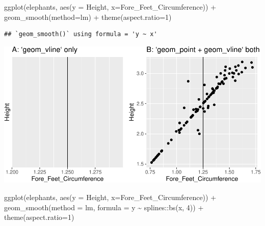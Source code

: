 \documentclass[
]{book}
\newenvironment{Shaded}{\begin{snugshade}}{\end{snugshade}}
\newcommand{\AttributeTok}[1]{\textcolor[rgb]{0.77,0.63,0.00}{#1}}
\newcommand{\DecValTok}[1]{\textcolor[rgb]{0.00,0.00,0.81}{#1}}
\newcommand{\FunctionTok}[1]{\textcolor[rgb]{0.00,0.00,0.00}{#1}}
\newcommand{\NormalTok}[1]{#1}
\newcommand{\SpecialCharTok}[1]{\textcolor[rgb]{0.00,0.00,0.00}{#1}}
\begin{document}
\begin{Shaded}
\begin{Highlighting}[]
\FunctionTok{ggplot}\NormalTok{(elephants, }\FunctionTok{aes}\NormalTok{(}\AttributeTok{y =}\NormalTok{ Height, }\AttributeTok{x=}\NormalTok{Fore\_Feet\_Circumference)) }\SpecialCharTok{+} 
  \FunctionTok{geom\_smooth}\NormalTok{(}\AttributeTok{method=}\NormalTok{lm) }\SpecialCharTok{+} 
  \FunctionTok{theme}\NormalTok{(}\AttributeTok{aspect.ratio=}\DecValTok{1}\NormalTok{)}
\end{Highlighting}
\end{Shaded}

\begin{verbatim}
## `geom_smooth()` using formula = 'y ~ x'
\end{verbatim}

\includegraphics{Data-Visualisation-geom-Encyclopedia_files/figure-latex/unnamed-chunk-50-1.pdf}

\begin{Shaded}
\begin{Highlighting}[]
\FunctionTok{ggplot}\NormalTok{(elephants, }\FunctionTok{aes}\NormalTok{(}\AttributeTok{y =}\NormalTok{ Height, }\AttributeTok{x=}\NormalTok{Fore\_Feet\_Circumference)) }\SpecialCharTok{+} 
  \FunctionTok{geom\_smooth}\NormalTok{(}\AttributeTok{method =}\NormalTok{ lm, }\AttributeTok{formula =}\NormalTok{ y }\SpecialCharTok{\textasciitilde{}}\NormalTok{ splines}\SpecialCharTok{::}\FunctionTok{bs}\NormalTok{(x, }\DecValTok{4}\NormalTok{)) }\SpecialCharTok{+} \FunctionTok{theme}\NormalTok{(}\AttributeTok{aspect.ratio=}\DecValTok{1}\NormalTok{)}
\end{Highlighting}
\end{Shaded}
\end{document}
